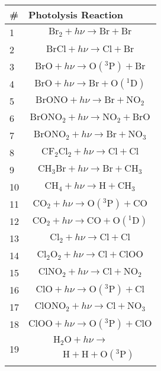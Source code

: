 \begin{longtable}{| m{} | m{} |}
\hline
\# & Photolysis Reaction \\
\hline
 1 & $$ \mathrm{Br_2} + h\nu\longrightarrow \mathrm{Br} + \mathrm{Br} $$\\
\hline
 2 & $$ \mathrm{BrCl} + h\nu\longrightarrow \mathrm{Cl} + \mathrm{Br} $$\\
\hline
 3 & $$ \mathrm{BrO} + h\nu\longrightarrow \mathrm{O(^3P)} + \mathrm{Br} $$\\
\hline
 4 & $$ \mathrm{BrO} + h\nu\longrightarrow \mathrm{Br} + \mathrm{O(^1D)} $$\\
\hline
 5 & $$ \mathrm{BrONO} + h\nu\longrightarrow \mathrm{Br} + \mathrm{NO_2} $$\\
\hline
 6 & $$ \mathrm{BrONO_2} + h\nu\longrightarrow \mathrm{NO_2} + \mathrm{BrO} $$\\
\hline
 7 & $$ \mathrm{BrONO_2} + h\nu\longrightarrow \mathrm{Br} + \mathrm{NO_3} $$\\
\hline
 8 & $$ \mathrm{CF_2Cl_2} + h\nu\longrightarrow \mathrm{Cl} + \mathrm{Cl} $$\\
\hline
 9 & $$ \mathrm{CH_3Br} + h\nu\longrightarrow \mathrm{Br} + \mathrm{CH_3} $$\\
\hline
 10 & $$ \mathrm{CH_4} + h\nu\longrightarrow \mathrm{H} + \mathrm{CH_3} $$\\
\hline
 11 & $$ \mathrm{CO_2} + h\nu\longrightarrow \mathrm{O(^3P)} + \mathrm{CO} $$\\
\hline
 12 & $$ \mathrm{CO_2} + h\nu\longrightarrow \mathrm{CO} + \mathrm{O(^1D)} $$\\
\hline
 13 & $$ \mathrm{Cl_2} + h\nu\longrightarrow \mathrm{Cl} + \mathrm{Cl} $$\\
\hline
 14 & $$ \mathrm{Cl_2O_2} + h\nu\longrightarrow \mathrm{Cl} + \mathrm{ClOO} $$\\
\hline
 15 & $$ \mathrm{ClNO_2} + h\nu\longrightarrow \mathrm{Cl} + \mathrm{NO_2} $$\\
\hline
 16 & $$ \mathrm{ClO} + h\nu\longrightarrow \mathrm{O(^3P)} + \mathrm{Cl} $$\\
\hline
 17 & $$ \mathrm{ClONO_2} + h\nu\longrightarrow \mathrm{Cl} + \mathrm{NO_3} $$\\
\hline
 18 & $$ \mathrm{ClOO} + h\nu\longrightarrow \mathrm{O(^3P)} + \mathrm{ClO} $$\\
\hline
 19 & $$
\begin{aligned}
&\mathrm{H_2O} + h\nu \longrightarrow \\
&\quad \mathrm{H} + \mathrm{H} + \mathrm{O(^3P)}

\end{aligned}$$
\end{longtable}
